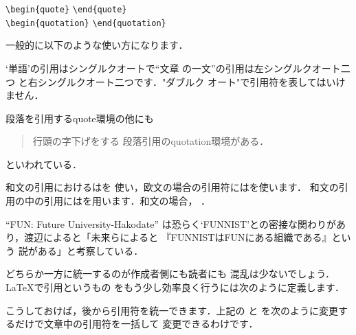 {\begin{Syntax}
\verb|\begin{quote}| 
   \verb|\end{quote}|\\
\verb|\begin{quotation}| 
   \verb|\end{quotation}|
\end{Syntax}
一般的に以下のような使い方になります．
\begin{InOut}
`単語'の引用はシングルクオートで``文章
の一文''の引用は左シングルクオート二つ
と右シングルクオート二つです．"ダブルク
オート"で引用符を表してはいけません．
\end{InOut} 
\begin{InOut}
段落を引用するquote環境の他にも
  \begin{quote}  行頭の字下げをする
    段落引用のquotation環境がある．
  \end{quote}  といわれている．
\end{InOut}

和文の引用におけるはを
使い，欧文の場合の引用符にはを使います．
和文の引用の中の引用にはを用います．和文の場合，
．
\begin{InOut}
``FUN: Future University-Hakodate''
は恐らく`FUNNIST'との密接な関わりがあ
り，渡辺によると「未来らによると
『FUNNISTはFUNにある組織である』という
説がある」と考察している．
\end{InOut}

どちらか一方に統一するのが作成者側にも読者にも
混乱は少ないでしょう．{\LaTeX}で引用というもの
をもう少し効率良く行うには次のように定義します．

\begin{InTeX}
\newcommand{\qu}[1]{`#1'}%
\newcommand{\qq}[1]{``#1''}%
\newcommand{\yo}[1]{「#1」}%
\newcommand{\yy}[1]{『#1』}%
\end{InTeX}

こうしておけば，後から引用符を統一できます．上記の  と 
を次のように変更するだけで文章中の引用符を一括して
変更できるわけです．

\begin{InTeX}
\newcommand{\yo}[1]{`#1'}%
\newcommand{\yy}[1]{``#1''}%
\end{InTeX}

}
